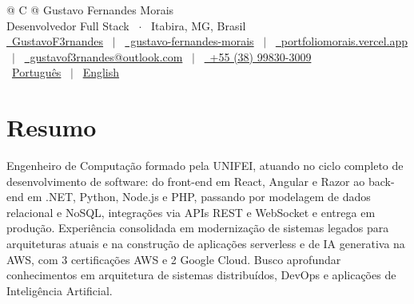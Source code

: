 \documentclass[a4paper,11pt]{article}
\begin{document}
\pagestyle{empty}


\begin{tabularx}{\linewidth}{@{} C @{}}
\Huge{Gustavo Fernandes Morais} \\[4pt]
\normalsize{Desenvolvedor Full Stack \ $\cdot$ \ Itabira, MG, Brasil} \\[7.5pt]
\href{https://github.com/GustavoF3rnandes}{\raisebox{-0.05\height}\faGithub\ GustavoF3rnandes} \ $|$ \
\href{https://www.linkedin.com/in/gustavo-fernandes-morais-6737a9243/}{\raisebox{-0.05\height}\faLinkedin\ gustavo-fernandes-morais} \ $|$ \
\href{https://portfoliomorais.vercel.app/}{\raisebox{-0.05\height}\faGlobe \ portfoliomorais.vercel.app} \ $|$ \
\href{mailto:gustavof3rnandes@outlook.com}{\raisebox{-0.05\height}\faEnvelope \ gustavof3rnandes@outlook.com} \ $|$ \
\href{tel:+5538998303009}{\raisebox{-0.05\height}\faMobile \ +55 (38) 99830-3009} \\[3pt]
\small{\raisebox{-0.05\height}\faLanguage \
\href{https://gustavof3rnandes.github.io/Curriculo/cv.pdf}{Português} \ $|$ \
\href{https://gustavof3rnandes.github.io/Curriculo/cv-en.pdf}{English}} \\
\end{tabularx}


\section{Resumo}
Engenheiro de Computação formado pela UNIFEI, atuando no ciclo completo de desenvolvimento de software: do front-end em React, Angular e Razor ao back-end em .NET, Python, Node.js e PHP, passando por modelagem de dados relacional e NoSQL, integrações via APIs REST e WebSocket e entrega em produção. Experiência consolidada em modernização de sistemas legados para arquiteturas atuais e na construção de aplicações serverless e de IA generativa na AWS, com 3 certificações AWS e 2 Google Cloud. Busco aprofundar conhecimentos em arquitetura de sistemas distribuídos, DevOps e aplicações de Inteligência Artificial.
\end{document}
